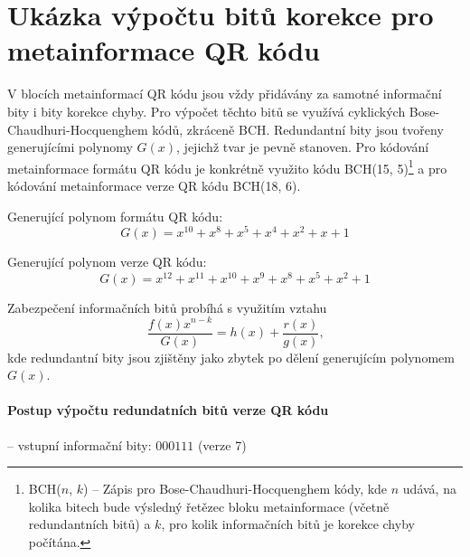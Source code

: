 \chapter{Ukázka výpočtu bitů korekce pro metainformace QR kódu}
\label{ukazkaVypoctuECCMetainformace}

V blocích metainformací QR kódu jsou vždy přidávány za samotné informační bity i
bity korekce chyby. Pro výpočet těchto bitů se využívá 
cyklických Bose-Chaudhuri-Hocquenghem kódů, zkráceně BCH. Redundantní bity
jsou tvořeny generujícími polynomy $G(x)$, jejichž tvar je pevně stanoven. Pro
kódování metainformace formátu QR kódu je konkrétně využito kódu BCH(15, 5)\footnote{BCH($n$, $k$) -- Zápis pro Bose-Chaudhuri-Hocquenghem kódy, kde $n$ udává, na kolika bitech bude výsledný řetězec bloku metainformace 
(včetně redundantních bitů) a $k$, pro kolik informačních bitů je korekce chyby
počítána.} a pro kódování metainformace verze QR kódu BCH(18, 6). \cite{ISO180042006}

\bigskip \noindent Generující polynom formátu QR kódu:
\begin{equation}
G(x) = x^{10} + x^8 + x^5 + x^4 + x^2 + x + 1
\end{equation}

\noindent Generující polynom verze QR kódu:
\begin{equation}
G(x) = x^{12} + x^{11} + x^{10} + x^9 + x^8 + x^5 + x^2 + 1
\end{equation}

\bigskip \noindent Zabezpečení informačních bitů probíhá s využitím vztahu 
\begin{equation}
  \frac{f(x) x^{n-k}}{G(x)} = h(x) + \frac{r(x)}{g(x)}\mbox{,}
\end{equation}
\noindent kde redundantní bity jsou zjištěny jako zbytek po dělení generujícím
polynomem $G(x)$. \cite{BCHCodesLiterature}

\subsubsection{Postup výpočtu redundatních bitů verze QR kódu}
\noindent -- vstupní informační bity: $000111$ (verze 7)

